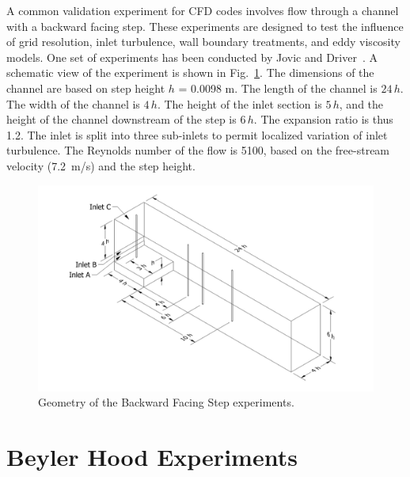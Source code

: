 A common validation experiment for CFD codes involves flow through a channel with a backward facing step. These experiments are designed to test the influence of grid resolution, inlet turbulence, wall boundary treatments, and eddy viscosity models. One set of experiments has been conducted by Jovic and Driver~\cite{JD:1994}.  A schematic view of the experiment is shown in Fig.~\ref{tunnel_drawing}. The dimensions of the channel are based on step height $h$ = 0.0098 m.  The length of the channel is $24 \, h$. The width of the channel is $4 \, h$. The height of the inlet section is $5 \, h$, and the height of the channel downstream of the step is $6 \, h$. The expansion ratio is thus 1.2.  The inlet is split into three sub-inlets to permit localized variation of inlet turbulence.  The Reynolds number of the flow is 5100, based on the free-stream velocity (7.2~m/s) and the step height.

\begin{figure}[!ht]
\includegraphics[width=\textwidth]{FIGURES/Backward_Facing_Step/tunnel_drawing}
\caption[Geometry of the Backward Facing Step experiments]{Geometry of the Backward Facing Step experiments.}
\label{tunnel_drawing}
\end{figure}


\section{Beyler Hood Experiments}
\label{Beyler_Hood_Description}

